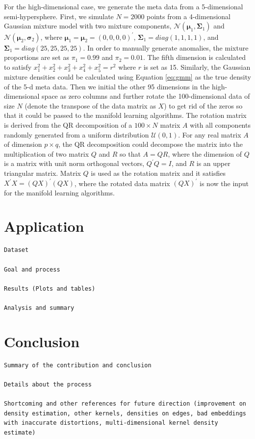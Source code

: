 \documentclass[11pt,a4paper,]{article}
\begin{document}
For the high-dimensional case, we generate the meta data from a 5-dimensional semi-hypersphere. First, we simulate \(N=2000\) points from a 4-dimensional Gaussian mixture model with two mixture components, \(\mathcal{N}(\pmb{\mu}_1, \pmb{\Sigma}_1)\) and \(\mathcal{N}(\pmb{\mu}_2, \pmb{\sigma}_2)\), where \(\pmb{\mu}_1 = \pmb{\mu}_2 =(0, 0, 0, 0)^\prime\), \(\pmb{\Sigma}_1 = diag(1,1,1,1)\), and \(\pmb{\Sigma}_1 = diag(25,25,25,25)\). In order to manually generate anomalies, the mixture proportions are set as \(\pi_1=0.99\) and \(\pi_2=0.01\).
The fifth dimension is calculated to satisfy \(x_1^2 + x_2^2 + x_3^2 + x_4^2 + x_5^2 = r^2\) where \(r\) is set as 15. Similarly, the Gaussian mixture densities could be calculated using Equation \eqref{eq:gmm} as the true density of the 5-d meta data.
Then we initial the other 95 dimensions in the high-dimensional space as zero columns and further rotate the 100-dimensional data of size \(N\) (denote the transpose of the data matrix as \(X\)) to get rid of the zeros so that it could be passed to the manifold learning algorithms.
The rotation matrix is derived from the QR decomposition of a \(100\times N\) matrix \(A\) with all components randomly generated from a uniform distribution \(\mathcal{U}(0,1)\).
For any real matrix \(A\) of dimension \(p\times q\), the QR decomposition could decompose the matrix into the multiplication of two matrix \(Q\) and \(R\) so that \(A = QR\), where the dimension of \(Q\) is a matrix with unit norm orthogonal vectors, \(Q^\prime Q = I\), and \(R\) is an upper triangular matrix. Matrix \(Q\) is used as the rotation matrix and it satisfies
\(X^\prime X=(QX)^\prime(QX)\), where the rotated data matrix \((QX)^\prime\) is now the input for the manifold learning algorithms.

\hypertarget{application}{%
\section{Application}\label{application}}

\begin{verbatim}
Dataset

Goal and process

Results (Plots and tables)

Analysis and summary
\end{verbatim}

\hypertarget{conclusion}{%
\section{Conclusion}\label{conclusion}}

\begin{verbatim}
Summary of the contribution and conclusion

Details about the process

Shortcoming and other references for future direction (improvement on density estimation, other kernels, densities on edges, bad embeddings with inaccurate distortions, multi-dimensional kernel density estimate)
\end{verbatim}

\printbibliography
\end{document}
